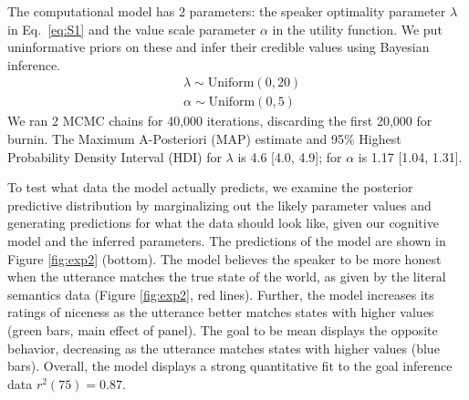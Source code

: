 \documentclass[10pt,letterpaper]{article}
\begin{document}
The computational model has 2 parameters: the speaker optimality parameter $\lambda$ in Eq.~\ref{eq:S1} and the value scale parameter $\alpha$ in the utility function. 
We put uninformative priors on these and infer their credible values using Bayesian inference.
\begin{eqnarray*}
& \lambda \sim \text{Uniform}(0,20)\\
& \alpha \sim \text{Uniform}(0, 5)
\end{eqnarray*}
We ran 2 MCMC chains for 40,000 iterations, discarding the first 20,000 for burnin.
The Maximum A-Posteriori (MAP) estimate and 95\% Highest Probability Density Interval (HDI) for $\lambda$ is 4.6 [4.0, 4.9]; for $\alpha$ is 1.17 [1.04, 1.31].%



To test what data the model actually predicts, we examine the posterior predictive distribution by marginalizing out the likely parameter values and generating predictions for what the data should look like, given our cognitive model and the inferred parameters.
The predictions of the model are shown in Figure \ref{fig:exp2} (bottom).
The model believes the speaker to be more honest when the utterance matches the true state of the world, as given by the literal semantics data (Figure \ref{fig:exp2}, red lines). 
Further, the model increases its ratings of niceness as the utterance better matches states with higher values (green bars, main effect of panel).
The goal to be mean displays the opposite behavior, decreasing as the utterance matches states with higher values (blue bars).
Overall, the model displays a strong quantitative fit to the goal inference data $r^2(75) = 0.87$.
\end{document}
